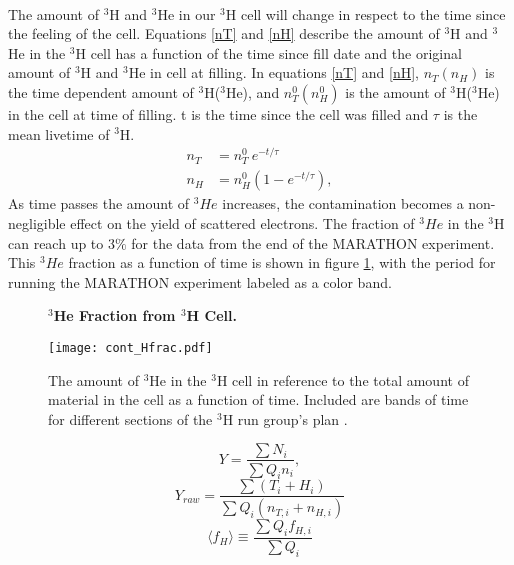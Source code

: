 \paragraph{}The amount of $^3$H and $^3$He in our $^3$H cell will change in respect to the time since the feeling of the cell. Equations \ref{nT} and \ref{nH} describe the amount of $^3$H and $^3$He in the $^3$H cell has a function of the time since fill date and the original amount of $^3$H and $^3$He in cell at filling. In equations \ref{nT} and \ref{nH}, $n_T(n_H)$ is the time dependent amount of $^3$H($^3$He), and  $n_T^0(n_H^0)$ is the amount of $^3$H($^3$He) in the cell at time of filling. t is the time since the cell was filled and $\tau$ is the mean livetime of $^3$H.
\begin{align}
	n_T &= n_T^0 \: e^{-t/\tau} \label{nT}\\
	n_H &= n_H^0(1 - e^{-t/\tau}) \label{nH},
\end{align}
As time passes the amount of $^3He$ increases, the contamination becomes a non-negligible effect on the yield of scattered electrons. The fraction of $^3He$ in the $^3$H can reach up to 3$\%$ for the data from the end of the MARATHON experiment. This $^3He$ fraction as a function of time is shown in figure \ref{Hfract}, with the period for running the MARATHON experiment labeled as a color band. 

\begin{figure}[t]
	\centering
	\textbf{$^3$He Fraction from $^3$H Cell. }\par\medskip
	\texttt{[image: cont\_Hfrac.pdf]}
	\caption{The amount of $^3$He in the $^3$H cell in reference to the total amount of material in the cell as a function of time. Included are bands of time for different sections of the $^3$H run group's plan \cite{Beta}.}
	\label{Hfract}
\end{figure}
\begin{equation}
Y = \frac{\sum N_i}{\sum Q_i n_i}, \label{yield} 
\end{equation}
\begin{equation}
Y_{raw} = \frac{\sum (T_i + H_i)}{\sum Q_i (n_{T,i} + n_{H,i})} \label{Yraw}
\end{equation}
\begin{equation}
\langle f_H \rangle \equiv \frac{\sum Q_i f_{H,i}}{\sum Q_i} \label{QwHf}
\end{equation}


